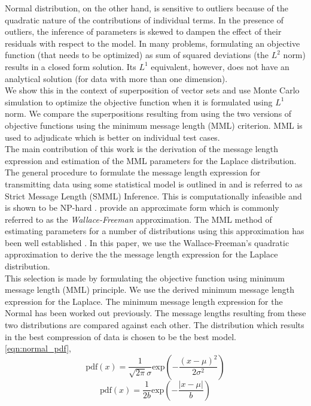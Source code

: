 \documentclass[wcp]{jmlr}
\begin{document}
Normal distribution, on the other hand, is sensitive to outliers because of the quadratic 
nature of the contributions of individual terms. In the presence 
of outliers, the inference of parameters is skewed to dampen the effect of their residuals 
with respect to the model. In many problems, formulating an objective function (that needs 
to be optimized) as sum of squared deviations (the $L^2$ norm) results in a closed
form solution. Its $L^1$ equivalent, however, does not have an analytical solution
(for data with more than one dimension). \\

We show this in the context of superposition of vector sets and use Monte Carlo simulation
to optimize the objective function when it is formulated using $L^1$ norm. We compare
the superpositions resulting from using the two versions of objective functions
using the minimum message length (MML) criterion. MML is used to adjudicate which is 
better on individual test cases. \\

The main contribution of this work is the derivation of the message length 
expression and estimation of the MML parameters for the Laplace distribution.
The general procedure to formulate the message length expression for transmitting
data using some statistical model is outlined in \citet{wallace-87} and is 
referred to as Strict Message Length (SMML) Inference. This is computationally
infeasible and is shown to be NP-hard \citep{Farr01012002}. \citet{wallace-87}
provide an approximate form which is commonly referred to as the 
\emph{Wallace-Freeman} approximation. The MML method
of estimating parameters for a number of distributions using this approximation
has been well established \citep{WallaceBook}. In this paper, we use the 
Wallace-Freeman's quadratic approximation
to derive the the message length expression for the Laplace distribution. \\

This selection is made by formulating the objective function using minimum message
length (MML) principle. We use the derived minimum message length expression for the Laplace.
The minimum message length expression for the Normal has been worked out previously. 
The message lengths resulting from these two distributions are compared against
each other. The distribution which results in the best compression of data is chosen
to be the best model. \\

\eqref{eqn:normal_pdf},
\begin{equation}
\mathrm{pdf}(x) = \frac{1}{\sqrt{2\pi}\sigma} \mathrm{exp}\left(-\frac{(x-\mu)^2}{2\sigma^2}\right) \label{eqn:normal_pdf}
\end{equation}
\begin{equation}
\mathrm{pdf}(x) = \frac{1}{2b}\mathrm{exp}\left(-\frac{|x-\mu|}{b}\right) \label{eqn:laplace_pdf}
\end{equation}
\end{document}

